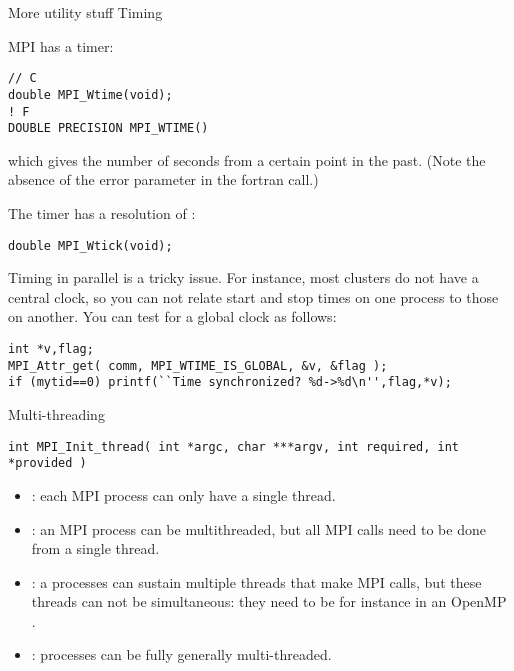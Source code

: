 {More utility stuff}
 {Timing}

MPI has a  timer: 
\begin{verbatim}
// C
double MPI_Wtime(void);
! F
DOUBLE PRECISION MPI_WTIME()
\end{verbatim}
which gives the number of seconds from a certain point in the past.
(Note the absence of the error parameter in the fortran call.)

The timer has a resolution of :
\begin{verbatim}
double MPI_Wtick(void);
\end{verbatim}

Timing in parallel is a tricky issue. For instance, most clusters do
not have a central clock, so you can not relate start and stop times
on one process to those on another. You can test for a global clock as
follows:
\begin{verbatim}
int *v,flag;
MPI_Attr_get( comm, MPI_WTIME_IS_GLOBAL, &v, &flag );
if (mytid==0) printf(``Time synchronized? %d->%d\n'',flag,*v);
\end{verbatim}


 {Multi-threading}

\begin{verbatim}
int MPI_Init_thread( int *argc, char ***argv, int required, int *provided )
\end{verbatim}

\begin{itemize}
\item {}: each MPI process can only have
  a single thread.
\item {}: an MPI process can be
  multithreaded, but all MPI calls need to be done from a single
  thread.
\item {}: a processes can sustain
  multiple threads that make MPI calls, but these threads can not be
  simultaneous: they need to be for instance in an OpenMP
  .
\item {}: processes can be fully
  generally multi-threaded.
\end{itemize}
